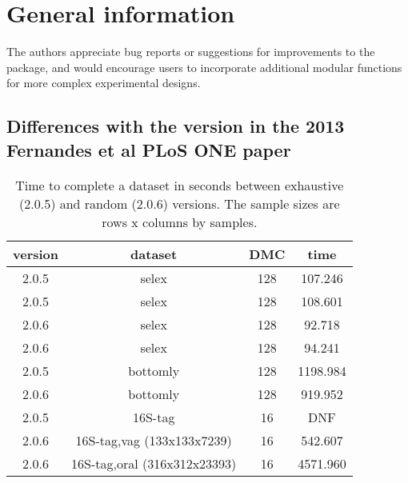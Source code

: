 \documentclass[11pt]{article}
\begin{document}
\section{General information}

The authors appreciate bug reports or suggestions for improvements to the package, and would encourage users to incorporate additional modular functions for more complex experimental designs.

\subsection{Differences with the version in the 2013 Fernandes et al PLoS ONE paper}  

\begin{table}
\begin{center}
\caption{Time to complete a dataset in seconds between exhaustive (2.0.5) and random (2.0.6) versions. The sample sizes are rows x columns by samples.}
\begin{tabular}{cccc}

version & dataset & DMC  &  time\\\hline
2.0.5  &  selex  &  128  &  107.246\\
2.0.5  &  selex  &  128  &  108.601\\
2.0.6  &  selex  &  128  &  92.718\\
2.0.6  &  selex  &  128  &  94.241\\
2.0.5  &  bottomly  &  128  &  1198.984   \\
2.0.6  &  bottomly  &  128  &  919.952\\
2.0.5  &  16S-tag  &  16  &  DNF\\
2.0.6  &  16S-tag,vag (133x133x7239)  &  16  &  542.607\\
2.0.6  &  16S-tag,oral (316x312x23393)  &  16  &  4571.960\\
\end{tabular}
\label{exvsra}
\end{center}
\end{table}
\end{document}
